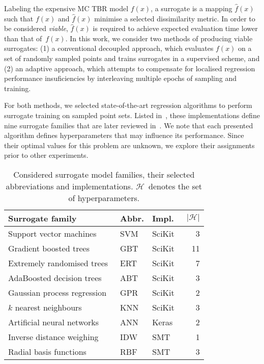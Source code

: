 Labeling the expensive MC TBR model $f(x)$, a surrogate is a mapping
$\hat{f}(x)$ such that $f(x)$ and $\hat{f}(x)$ minimise a selected dissimilarity
metric. In order to be considered \textit{viable}, $\hat{f}(x)$ is required to
achieve expected evaluation time lower than that of~$f(x)$. In this work, we
consider two methods of producing viable surrogates: (1) a conventional decoupled
approach, which evaluates $f(x)$ on a set of randomly sampled points and
trains surrogates in a supervised scheme, and (2) an adaptive approach, which attempts to
compensate for localised regression performance insuficiencies by interleaving
multiple epochs of sampling and training.

For both methods, we selected state-of-the-art regression algorithms to perform
surrogate training on sampled point sets. Listed in~, these
implementations define nine surrogate families that are later reviewed in~.
We note that each presented algorithm defines hyperparameters that may influence its
performance. Since their optimal values for this problem are unknown, we explore
their assignments prior to other experiments.

\begin{table}[t]
	\setlength\tabcolsep{2pt}
	\caption{\label{tbl:surrogates}Considered surrogate model families, their
		selected abbreviations and implementations. $\mathcal{H}$~denotes the
		set of hyperparameters.}
	\begin{indented}
	\item[]
		\begin{tabular}{lllr}
		\toprule
		Surrogate family & Abbr. & Impl. & $|\mathcal{H}|$ \\
		\midrule
		Support vector machines~\cite{fan2008liblinear}	& SVM & SciKit~\cite{scikit-learn} & 3 \\
		Gradient boosted trees~\cite{friedman2001greedy,friedman1999stochastic,hastie2009elements}	& GBT & SciKit & 11 \\
		Extremely randomised trees~\cite{geurts2006extremely}	& ERT & SciKit & 7 \\
		AdaBoosted decision trees~\cite{drucker1997improving}	& ABT & SciKit & 3 \\
		Gaussian process regression~\cite{williams2006gaussian}	& GPR & SciKit & 2 \\
		$k$ nearest neighbours	& KNN & SciKit & 3 \\
		Artificial neural networks	& ANN & Keras~\cite{chollet2015keras} & 2 \\
		Inverse distance weighing~\cite{shepard1968two} & IDW & SMT~\cite{SMT2019} & 1 \\
		Radial basis functions & RBF & SMT & 3 \\
		\bottomrule
		\end{tabular}
	\end{indented}
\end{table}

